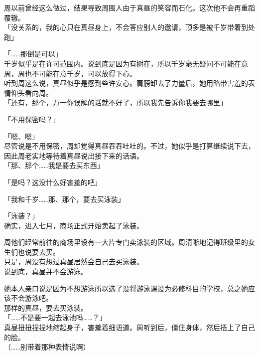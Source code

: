 周以前曾经这么做过，结果导致周围人由于真昼的笑容而石化。这次他不会再重蹈覆辙。\\

「没关系的，我的心只在真昼身上，不会答应别人的邀请，顶多是被千岁带着到处跑」

「……那倒是可以」\\

千岁似乎是在许可范围内。说到底是因为有树在，所以千岁毫无疑问不可能在意周，周也不可能在意千岁，可以放得下心。\\

听到周这么说，真昼似乎是感到些许安心。肩膀卸去了力量后，她用略带害羞的表情仰头看向周。\\

「还有，那个，万一你误解的话就不好了，所以我先告诉你我要去哪里」

「不用保密吗？」

「嗯、嗯」\\

尽管说是不用保密，周却觉得真昼吞吞吐吐的。不过，她似乎是打算继续说下去，因此周老实地等待着真昼说出接下来的话语。\\

「那、那个……我是要去买东西」

「是吗？这没什么好害羞的吧」

「我和千岁……那、那个，要去买泳装」

「泳装？」\\

确实，进入七月，商场正式开始卖起了泳装。

周他们经常前往的商场里设有一大片专门卖泳装的区域。周清晰地记得班级里的女生们也说要去买。\\

只是，周没有想过真昼居然会自己去买泳装。\\

说到底，真昼并不会游泳。

她本人亲口说是因为不想游泳所以选了没将游泳课设为必修科目的学校，总之她应该不会游泳吧。\\

那样的真昼，要去买泳装。\\

「……不是要一起去泳池吗……？」\\

真昼扭扭捏捏地缩起身子，害羞着细语道。周听到后，僵住身体，然后捂上了自己的脸。\\

（……别带着那种表情说啊）\\


